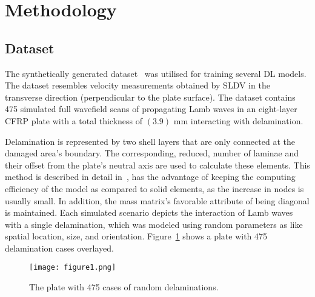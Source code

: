 \section{Methodology}
\label{methodology}
\subsection{Dataset}
The synthetically generated dataset~\cite{Ijjeh2021} was utilised for training several DL models.
The dataset resembles velocity measurements obtained by SLDV in the transverse direction (perpendicular to the plate surface).
The dataset contains 475 simulated full wavefield scans of propagating Lamb waves in an eight-layer CFRP plate with a total thickness of \((3.9)\) mm interacting with delamination.

Delamination is represented by two shell layers that are only connected at the damaged area's boundary.
The corresponding, reduced, number of laminae and their offset from the plate's neutral axis are used to calculate these elements.
This method is described in detail in~\cite{Kudela2009}, has the advantage of keeping the computing efficiency of the model as compared to solid elements, as the increase in nodes is usually small.
In addition, the mass matrix's favorable attribute of being diagonal is maintained. 
Each simulated scenario depicts the interaction of Lamb waves with a single delamination, which was modeled using random parameters as like spatial location, size, and orientation.
Figure~\ref{fig:rand_delaminations} shows a plate with 475 delamination cases overlayed.
\begin{figure} [h!]
	\begin{center}
		\texttt{[image: figure1.png]}
	\end{center}
	\caption{The plate with 475 cases of random delaminations.} 
	\label{fig:rand_delaminations}
\end{figure}

